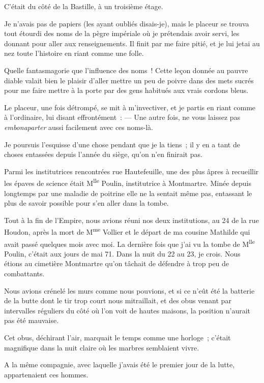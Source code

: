 \documentclass[french,twoside]{book} %
\begin{document}
C’était du côté de la Bastille, à un troisième étage.\par
Je n’avais pas de papiers (les ayant oubliés disais-je), mais le placeur se trouva tout étourdi  des noms de la pègre impériale où je prétendais avoir servi, les donnant pour aller aux renseignements. Il finit par me faire pitié, et je lui jetai au nez toute l’histoire en riant comme une folle.\par
Quelle fantasmagorie que l’influence des noms ! Cette leçon donnée au pauvre diable valait bien le plaisir d’aller mettre un peu de poivre dans des mets sucrés pour me faire mettre à la porte par des gens habitués aux vrais cordons bleus.\par
Le placeur, une fois détrompé, se mit à m’invectiver, et je partis en riant comme à l’ordinaire, lui disant effrontément : — Une autre fois, ne vous laissez pas \emph{embonaparter} aussi facilement avec ces noms-là.\par
Je poursuis l’esquisse d’une chose pendant que je la tiens ; il y en a tant de choses entassées depuis l’année du siège, qu’on n’en finirait pas.\par
Parmi les institutrices rencontrées rue Hautefeuille, une des plus âpres à recueillir les épaves de science était M\textsuperscript{lle} Poulin, institutrice à Montmartre. Minée depuis longtemps par une maladie de poitrine elle ne la sentait même pas, entassant le plus de savoir possible pour s’en aller dans la tombe.\par
Tout à la fin de l’Empire, nous avions réuni nos deux institutions, au 24 de la rue Houdon,  après la mort de M\textsuperscript{me} Vollier et le départ de ma cousine Mathilde qui avait passé quelques mois avec moi. La dernière fois que j’ai vu la tombe de M\textsuperscript{lle} Poulin, c’était aux jours de mai 71. Dans la nuit du 22 au 23, je crois. Nous étions au cimetière Montmartre qu’on tâchait de défendre à trop peu de combattants.\par
Nous avions crénelé les murs comme nous pouvions, et si ce n’eût été la batterie de la butte dont le tir trop court nous mitraillait, et des obus venant par intervalles réguliers du côté où l’on voit de hautes maisons, la position n’aurait pas été mauvaise.\par
Cet obus, déchirant l’air, marquait le temps comme une horloge ; c’était magnifique dans la nuit claire où les marbres semblaient vivre.\par
A la même compagnie, avec laquelle j’avais été le premier jour de la lutte, appartenaient ces hommes.\par
\end{document}
